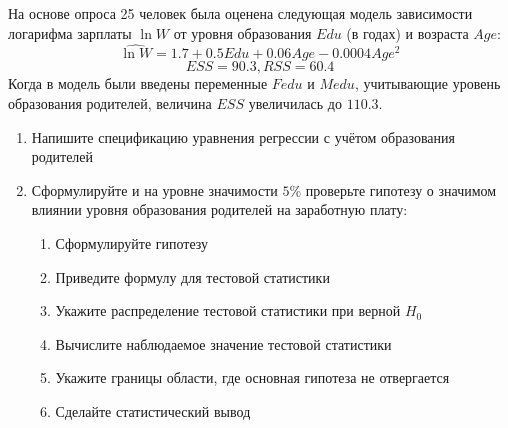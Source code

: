 \documentclass[pdftex,11pt,openany]{book}\usepackage[]{graphicx}\usepackage[]{color}
\begin{document}
\begin{problem}
 На основе опроса 25 человек была оценена следующая модель зависимости логарифма зарплаты $\ln W$ от уровня образования $Edu$ (в годах) и возраста $Age$: 
\[
\widehat{\ln W} = 1.7 + 0.5Edu + 0.06Age - 0.0004Age^2
\]
\[
ESS = 90.3, RSS = 60.4
\]
Когда в модель были введены переменные $Fedu$ и $Medu$, учитывающие уровень образования родителей, величина $ESS$ увеличилась до $110.3.$
\begin{enumerate}
\item Напишите спецификацию уравнения регрессии с учётом образования родителей
\item Сформулируйте и на уровне значимости $5\%$ проверьте гипотезу о значимом влиянии уровня образования родителей на заработную плату:
\begin{enumerate}
\item Сформулируйте гипотезу
\item Приведите формулу для тестовой статистики 
\item Укажите распределение тестовой статистики при верной $H_0$
\item Вычислите наблюдаемое значение тестовой статистики
\item Укажите границы области, где основная гипотеза не отвергается
\item Сделайте статистический вывод
\end{enumerate}
\end{enumerate}
\end{problem}
\end{document}
